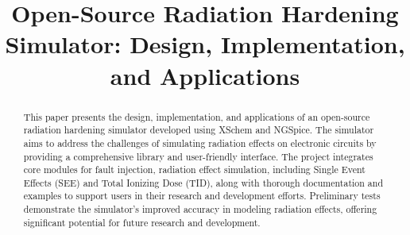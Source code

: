 \documentclass[conference]{IEEEtran}
\begin{document}
    \title{Open-Source Radiation Hardening Simulator: Design, Implementation, and Applications}

    \author{
        \and
        \and
        \and
        \and
    }

    \maketitle

    \begin{abstract}
        This paper presents the design, implementation, and applications of an open-source radiation hardening simulator developed using XSchem and NGSpice.
        The simulator aims to address the challenges of simulating radiation effects on electronic circuits by providing a comprehensive library and user-friendly interface.
        The project integrates core modules for fault injection, radiation effect simulation, including Single Event Effects (SEE) and Total Ionizing Dose (TID), along with thorough documentation and examples to support users in their research and development efforts.
        Preliminary tests demonstrate the simulator's improved accuracy in modeling radiation effects, offering significant potential for future research and development.
    \end{abstract}
\end{document}
